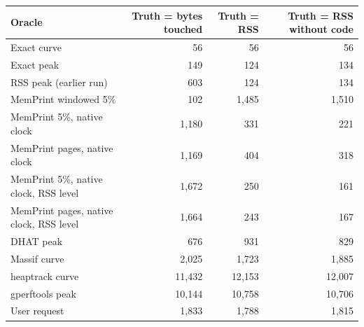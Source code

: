 \begin{tabular}{lrrr}
\toprule
Oracle & Truth = bytes touched & Truth = RSS & Truth = RSS without code \\
\midrule
Exact curve & 56 & 56 & 56 \\
Exact peak & 149 & 124 & 134 \\
RSS peak (earlier run) & 603 & 124 & 134 \\
MemPrint windowed 5\% & 102 & 1{,}485 & 1{,}510 \\
MemPrint 5\%, native clock & 1{,}180 & 331 & 221 \\
MemPrint pages, native clock & 1{,}169 & 404 & 318 \\
MemPrint 5\%, native clock, RSS level & 1{,}672 & 250 & 161 \\
MemPrint pages, native clock, RSS level & 1{,}664 & 243 & 167 \\
DHAT peak & 676 & 931 & 829 \\
Massif curve & 2{,}025 & 1{,}723 & 1{,}885 \\
heaptrack curve & 11{,}432 & 12{,}153 & 12{,}007 \\
gperftools peak & 10{,}144 & 10{,}758 & 10{,}706 \\
User request & 1{,}833 & 1{,}788 & 1{,}815 \\
\bottomrule
\end{tabular}
